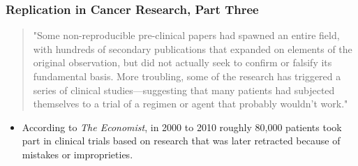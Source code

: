 \documentclass[10pt, block=fill]{beamer}
\begin{document}
\begin{frame}
    \frametitle{Replication in Cancer Research, Part Three}
    \begin{quote}
         "Some non-reproducible pre-clinical papers had spawned an entire field, with hundreds of secondary publications that expanded on elements of the original observation, but did not actually seek to confirm or falsify its fundamental basis. More troubling, some of the research has triggered a series of clinical studies—suggesting that many patients had subjected themselves to a trial of a regimen or agent that probably wouldn't work."
    \end{quote}
    \begin{itemize}
      \item According to \textit{The Economist}, in 2000 to 2010 roughly 80,000 patients took part in clinical trials based on research that was later retracted because of mistakes or improprieties.
  \end{itemize}
  
\end{frame}
\end{document}
